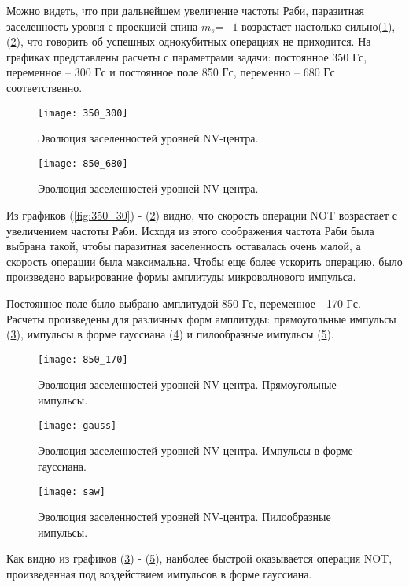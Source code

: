 Можно видеть, что при дальнейшем увеличение частоты Раби, паразитная
заселенность уровня с проекцией спина $m_s$=$-1$ возрастает настолько
сильно(\ref{fig:350_300}), (\ref{fig:850_680}), что говорить об успешных
однокубитных операциях не приходится. На графиках представлены расчеты
с параметрами задачи: постоянное 350 Гс, переменное -- 300 Гс и
постоянное поле 850 Гс, переменно -- 680 Гс соответственно.
\begin{figure}[h!]\centering
  \texttt{[image: 350\_300]}
  \caption{Эволюция заселенностей уровней NV-центра.}\label{fig:350_300}
\end{figure}
\begin{figure}[h!]\centering
  \texttt{[image: 850\_680]}
  \caption{Эволюция заселенностей уровней NV-центра.}\label{fig:850_680}
\end{figure}

Из графиков (\ref{fig:350_30}) - (\ref{fig:850_680}) видно, что скорость
операции NOT возрастает с увеличением частоты Раби. Исходя из этого
соображения частота Раби была выбрана такой, чтобы паразитная
заселенность оставалась очень малой, а скорость операции была
максимальна. Чтобы еще более ускорить операцию, было произведено
варьирование формы амплитуды микроволнового импульса.

Постоянное поле было выбрано амплитудой 850 Гс, переменное -
170 Гс. Расчеты произведены для различных форм амплитуды: прямоугольные
импульсы (\ref{fig:850_170}), импульсы в форме гауссиана
(\ref{fig:gauss}) и пилообразные импульсы (\ref{fig:saw}).
\begin{figure}[H]\centering
  \texttt{[image: 850\_170]}
  \caption{Эволюция заселенностей уровней NV-центра. Прямоугольные импульсы.}\label{fig:850_170}
\end{figure}
\begin{figure}[H]\centering
  \texttt{[image: gauss]}
  \caption{Эволюция заселенностей уровней NV-центра. Импульсы в форме гауссиана.}\label{fig:gauss}
\end{figure}
\begin{figure}[H]\centering
  \texttt{[image: saw]}
  \caption{Эволюция заселенностей уровней NV-центра. Пилообразные импульсы.}\label{fig:saw}
\end{figure}

Как видно из графиков (\ref{fig:850_170}) - (\ref{fig:saw}), наиболее
быстрой оказывается операция NOT, произведенная под воздействием
импульсов в форме гауссиана.

